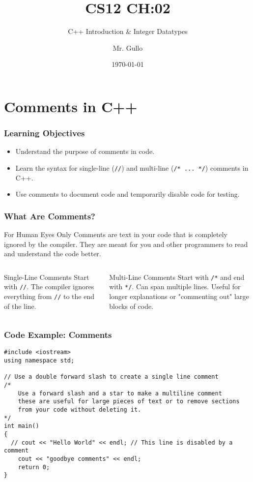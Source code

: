 \documentclass{beamer}
\title[Integer Datatypes]{CS12 CH:02}
\subtitle{C++ Introduction \& Integer Datatypes}
\author[Mr. Gullo]{Mr. Gullo}
\date[\today]{\today}
\begin{document}
\frame{\titlepage}

\section{Comments in C++}

\begin{frame}
\frametitle{Learning Objectives}
\begin{itemize}
    \item Understand the purpose of comments in code.\pause
    \item Learn the syntax for single-line (\texttt{//}) and multi-line (\texttt{/* ... */}) comments in C++.\pause
    \item Use comments to document code and temporarily disable code for testing.
\end{itemize}
\end{frame}

\begin{frame}
\frametitle{What Are Comments?}
\begin{block}{For Human Eyes Only}
Comments are text in your code that is completely ignored by the compiler. They are meant for you and other programmers to read and understand the code better.
\end{block}
\pause

\begin{columns}[T]
    \begin{column}{0.5\textwidth}
        \begin{alertblock}{Single-Line Comments}
        Start with \texttt{//}. The compiler ignores everything from \texttt{//} to the end of the line.
        \end{alertblock}
    \end{column}\pause
    \begin{column}{0.5\textwidth}
        \begin{exampleblock}{Multi-Line Comments}
        Start with \texttt{/*} and end with \texttt{*/}. Can span multiple lines. Useful for longer explanations or "commenting out" large blocks of code.
        \end{exampleblock}
    \end{column}
\end{columns}
\end{frame}

\begin{frame}[fragile]
\frametitle{Code Example: Comments}
\begin{verbatim}
#include <iostream>
using namespace std;

// Use a double forward slash to create a single line comment
/*
    Use a forward slash and a star to make a multiline comment
    these are useful for large pieces of text or to remove sections
    from your code without deleting it.
*/
int main()
{
  // cout << "Hello World" << endl; // This line is disabled by a comment
    cout << "goodbye comments" << endl;
    return 0;
}
\end{verbatim}
\end{frame}
\end{document}
